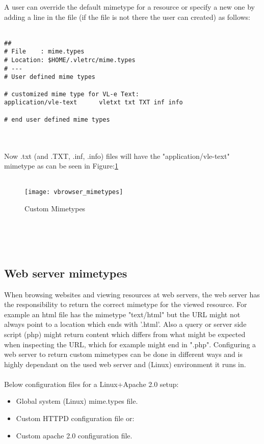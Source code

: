 A user can override the default mimetype for a resource or specify a new one  
by adding a line in the  file (if the file is not there the user can created) as follows:\\
\\
\begin{boxedlisting}
\begin{verbatim}
##
# File    : mime.types 
# Location: $HOME/.vletrc/mime.types
# ---
# User defined mime types 

# customized mime type for VL-e Text: 
application/vle-text      vletxt txt TXT inf info

# end user defined mime types
\end{verbatim}
\end{boxedlisting}\\
\\
Now .txt (and .TXT, .inf, .info) files will have the "application/vle-text" mimetype 
as can be seen in Figure:\ref{fig:custom_mimetypes}\\
\\
\begin{figure}[htbp]
\centerline{\texttt{[image: vbrowser\_mimetypes]}}
\caption{Custom Mimetypes}
\label{fig:custom_mimetypes}
\end{figure}\\
\\
\\
\subsection{Web server mimetypes}

When browsing websites and viewing resources at web servers, the web server has the 
responsibility to return the correct mimetype for the viewed resource. 
For example an html file has the mimetype "text/html" but the URL might not always 
point to a location which ends with '.html'.
Also a query or server side script (php) might return content which differs from what 
might be expected when inspecting the URL, which for example might end in ".php". 
Configuring a web server to return custom mimetypes can be done in different ways and
is highly dependant on the used web server and (Linux) environment it runs in.\\
\\
Below configuration files for a Linux+Apache 2.0 setup: 
\begin{itemize}
  \item {} Global system (Linux) mime.types file.   
  \item {} Custom HTTPD configuration file or:  
  \item {} Custom apache 2.0 configuration file. 
\end{itemize}
 
